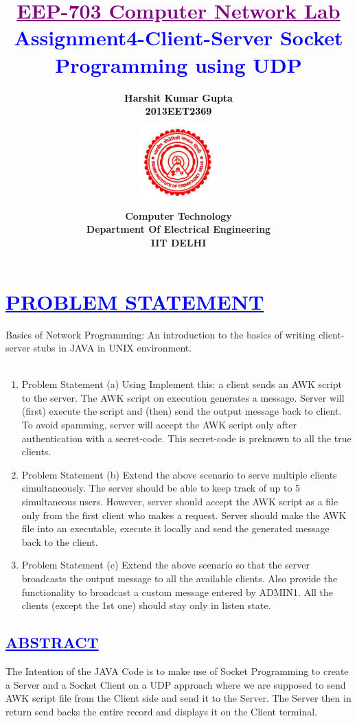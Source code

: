 \documentclass[a4paper,12pt]{report}
\title{\bfseries\huge \textcolor{purple}{\underline {EEP-703 Computer Network Lab}} \\{\textcolor{blue}{Assignment4-Client-Server Socket Programming using UDP}}}
\author{\bfseries\large\textcolor{black}  {Harshit  Kumar Gupta}\\ {\textcolor{black} {2013EET2369 }}\\
\includegraphics[width=3cm,height=3.4cm]{./iit.png}\\\noindent Computer Technology\\
\noindent Department Of Electrical Engineering\\IIT DELHI}
\begin{document}
\maketitle
\tableofcontents


\chapter{\textcolor{blue}{\underline {PROBLEM STATEMENT}}}
\noindent 
         Basics of Network Programming: An introduction to the basics of writing client-server stubs in JAVA in UNIX
environment.\\\\
\begin{enumerate}
 \item Problem Statement (a)
  Using Implement this: a client sends an AWK script to the server. The AWK script on execution
generates a message. Server will (first) execute the script and (then) send the output message
back to client. To avoid spamming, server will accept the AWK script only after authentication
with a secret-code. This secret-code is pre­known to all the true clients.
\item Problem Statement (b)
Extend the above scenario to serve multiple clients simultaneously. The server should be able to
keep track of up to 5 simultaneous users. However, server should accept the AWK script as a
file only from the first client who makes a request. Server should make the AWK file into an
executable, execute it locally and send the generated message back to the client.
\item Problem Statement (c)
Extend the above scenario so that the server broadcasts the output message to all the available
clients. Also provide the functionality to broadcast a custom message entered by ADMIN1. All the
clients (except the 1st one) should stay only in listen state.
\end{enumerate}

 



\begin{center}
\chapter{\textcolor{blue}{\underline {ABSTRACT}}}
\end{center}
\noindent The Intention of the JAVA Code is to make use of Socket Programming to create a Server and a Socket Client on a UDP approach
	  where we are supposed to send AWK script file from the Client side and send it to the Server.
	  The Server then in return send backs the entire record and displays it on the Client terminal.
\end{document}
